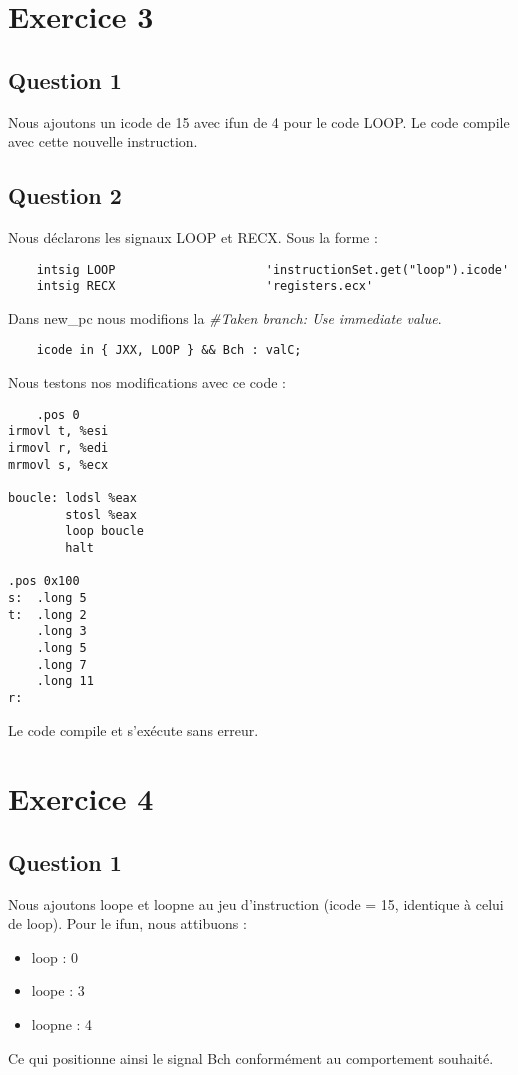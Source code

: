 \documentclass[a4paper,10pt]{article}
\begin{document}
\section{Exercice 3}
\subsection{Question 1}
Nous ajoutons un icode de 15 avec ifun de 4 pour le code LOOP. Le code compile avec cette nouvelle instruction.

\subsection{Question 2}
Nous déclarons les signaux LOOP et RECX. Sous la forme :
\begin{verbatim}
    intsig LOOP                     'instructionSet.get("loop").icode'
    intsig RECX                     'registers.ecx'
\end{verbatim}


Dans new\_pc nous modifions la \textit{\#Taken branch: Use immediate value}.

\begin{verbatim}
    icode in { JXX, LOOP } && Bch : valC;
\end{verbatim}

Nous testons nos modifications avec ce code :

\begin{verbatim}
    .pos 0
irmovl t, %esi
irmovl r, %edi
mrmovl s, %ecx

boucle: lodsl %eax
        stosl %eax
        loop boucle
        halt

.pos 0x100
s:  .long 5
t:  .long 2
    .long 3
    .long 5
    .long 7
    .long 11
r:

\end{verbatim}
Le code compile et s'exécute sans erreur.

\section{Exercice 4}
\subsection{Question 1}
Nous ajoutons loope et loopne au jeu d'instruction (icode = 15, identique à celui de loop).
Pour le ifun, nous attibuons :
\begin{itemize}
    \item loop : 0
    \item loope : 3
    \item loopne : 4
\end{itemize}
Ce qui positionne ainsi le signal Bch conformément au comportement souhaité.
\end{document}
